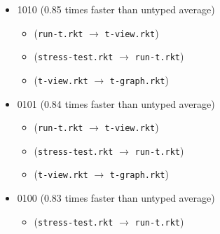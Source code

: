 \documentclass{article}
\newcommand{\mono}[1]{\texttt{#1}}
\begin{document}
\begin{itemize}
\begin{itemize}
  \end{itemize}
\item 1010 (0.85 times faster than untyped average)
  \begin{itemize}
  \item (\mono{run-t.rkt} $\rightarrow$ \mono{t-view.rkt})
  \item (\mono{stress-test.rkt} $\rightarrow$ \mono{run-t.rkt})
  \item (\mono{t-view.rkt} $\rightarrow$ \mono{t-graph.rkt})
  \end{itemize}
\item 0101 (0.84 times faster than untyped average)
  \begin{itemize}
  \item (\mono{run-t.rkt} $\rightarrow$ \mono{t-view.rkt})
  \item (\mono{stress-test.rkt} $\rightarrow$ \mono{run-t.rkt})
  \item (\mono{t-view.rkt} $\rightarrow$ \mono{t-graph.rkt})
  \end{itemize}
\item 0100 (0.83 times faster than untyped average)
  \begin{itemize}
  \item (\mono{stress-test.rkt} $\rightarrow$ \mono{run-t.rkt})
  \end{itemize}


\end{itemize}
\end{document}
